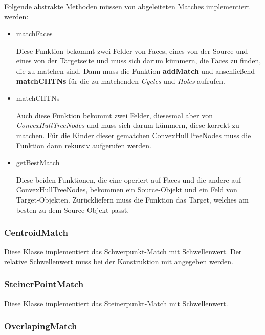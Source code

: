 Folgende abstrakte Methoden müssen von abgeleiteten Matches implementiert werden:

\begin{itemize}

\item matchFaces

Diese Funktion bekommt zwei Felder von Faces, eines von der Source und eines von der Targetseite und muss sich darum kümmern, die Faces zu finden, die zu matchen sind. Dann muss die Funktion \textbf{addMatch} und anschließend \textbf{matchCHTNs} für die zu matchenden \textit{Cycles} und \textit{Holes} aufrufen.

\item matchCHTNs

Auch diese Funktion bekommt zwei Felder, diesesmal aber von \textit{ConvexHullTreeNodes} und muss sich darum kümmern, diese korrekt zu matchen. Für die Kinder dieser gematchen ConvexHullTreeNodes muss die Funktion dann rekursiv aufgerufen werden.

\item getBestMatch

Diese beiden Funktionen, die eine operiert auf Faces und die andere auf ConvexHullTreeNodes, bekommen ein Source-Objekt und ein Feld von Target-Objekten. Zurückliefern muss die Funktion das Target, welches am besten zu dem Source-Objekt passt.

\end{itemize}

\subsubsection{CentroidMatch}

Diese Klasse implementiert das Schwerpunkt-Match mit Schwellenwert. Der relative Schwellenwert muss bei der Konstruktion mit angegeben werden.

\subsubsection{SteinerPointMatch}

Diese Klasse implementiert das Steinerpunkt-Match mit Schwellenwert.

\subsubsection{OverlapingMatch}


